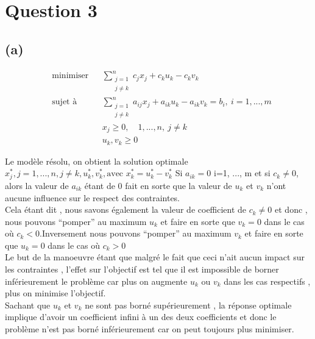 \documentclass{article}
\begin{document}
\section*{Question 3}
\subsection*{(a)}
\begin{center}
\begin{equation*}
   \begin{aligned}
      & \underset{}{\text{minimiser}}
      & & \sum_{\substack{j=1\\j\neq k}}^{n} c_jx_j+c_ku_k-c_kv_k\\
      & \text{sujet à}
         & & \sum_{\substack{j=1\\j\neq k}}^{n} a_{ij}x_j+a_{ik}u_k-a_{ik}v_k
         =b_i , \: i=1,...,m\\ 
        &   &   & x_j \geq 0,\quad 1,...,n ,\: j\neq k \\
        &   &   & u_k, v_k \ge 0       
\end{aligned}
\end{equation*}
\end{center}
\begin{spacing}{1.2}
\noindent Le modèle résolu, on obtient la solution optimale
$x_j^* , j = 1, ..., n, j \neq k, u^*_k, v^*_k, \text{avec }
x^*_k = u^*_k-v^*_k$
Si $a_{ik} = 0$ i=1, ..., m et si $c_k \neq 0$, alors la valeur de $a_{ik}$ étant de 0 fait en sorte que la valeur de $u_k$ et $v_k$ n'ont aucune influence sur le respect des contraintes.\\

\noindent Cela étant dit , nous savons également la valeur de  coefficient  de $c_k \neq 0$ et donc , nous pouvons ``pomper'' au maximum $u_k$ et faire en sorte  que $v_k=0$ dans le cas où $c_k < 0$.Inversement nous pouvons ``pomper'' au maximum $v_k$ et faire en sorte  que $u_k=0$ dans le cas où $c_k>0$\\

\noindent Le but de la manoeuvre étant que malgré le fait que ceci n'ait aucun impact sur les contraintes , l'effet sur l'objectif est tel que il est impossible de borner inférieurement le problème car plus on augmente $u_k$ ou $v_k$ dans les cas respectifs , plus on minimise l'objectif.\\

\noindent Sachant que $u_k$ et $v_k$ ne sont pas borné supérieurement , la réponse optimale implique d'avoir un coefficient infini à un des deux coefficients et donc le problème n'est pas borné inférieurement car on peut toujours plus minimiser.
\end{spacing}
\end{document}
